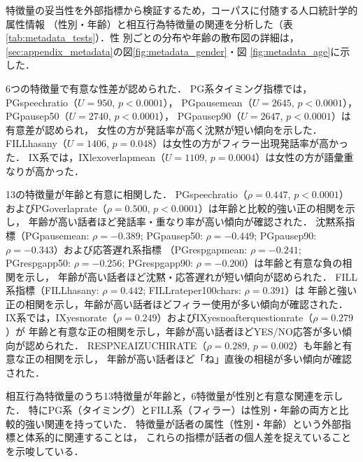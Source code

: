\documentclass[dvipdfmx,11pt,a4paper]{bxjsarticle}
\renewcommand{\_}{\paperorigunderscore\allowbreak}%
\begin{document}
特徴量の妥当性を外部指標から検証するため，コーパスに付随する人口統計学的属性情報
（性別・年齢）と相互行為特徴量の関連を分析した（表\ref{tab:metadata_tests}）．性
別ごとの分布や年齢の散布図の詳細は，\ref{sec:appendix_metadata}の図\ref{fig:metadata_gender}・図
\ref{fig:metadata_age}に示した．


\begin{table}[htbp]
\centering
\caption{相互行為特徴量とコーパス基本情報（性別・年齢）の関連．* $p < 0.05$}
\label{tab:metadata_tests}

\end{table}


6つの特徴量で有意な性差が認められた．
PG系タイミング指標では，PG\_speech\_ratio（$U = 950$, $p < 0.0001$），
PG\_pause\_mean（$U = 2645$, $p < 0.0001$），
PG\_pause\_p50（$U = 2740$, $p < 0.0001$），
PG\_pause\_p90（$U = 2647$, $p < 0.0001$）は有意差が認められ，
女性の方が発話率が高く沈黙が短い傾向を示した．
FILL\_has\_any（$U = 1406$, $p = 0.048$）は女性の方がフィラー出現発話率が高かった．
IX系では，IX\_lex\_overlap\_mean（$U = 1109$, $p = 0.0004$）は女性の方が語彙重なりが高かった．

13の特徴量が年齢と有意に相関した．
PG\_speech\_ratio（$\rho = 0.447$, $p < 0.0001$）およびPG\_overlap\_rate（$\rho = 0.500$, $p < 0.0001$）は年齢と比較的強い正の相関を示し，
年齢が高い話者ほど発話率・重なり率が高い傾向が確認された．
沈黙系指標（PG\_pause\_mean: $\rho = -0.389$; PG\_pause\_p50: $\rho = -0.449$;
PG\_pause\_p90: $\rho = -0.343$）および応答遅れ系指標
（PG\_resp\_gap\_mean: $\rho = -0.241$; PG\_resp\_gap\_p50: $\rho = -0.256$;
PG\_resp\_gap\_p90: $\rho = -0.200$）は年齢と有意な負の相関を示し，
年齢が高い話者ほど沈黙・応答遅れが短い傾向が認められた．
FILL系指標（FILL\_has\_any: $\rho = 0.442$; FILL\_rate\_per\_100chars: $\rho = 0.391$）は
年齢と強い正の相関を示し，年齢が高い話者ほどフィラー使用が多い傾向が確認された．
IX系では，IX\_yesno\_rate（$\rho = 0.249$）およびIX\_yesno\_after\_question\_rate（$\rho = 0.279$）が
年齢と有意な正の相関を示し，年齢が高い話者ほどYES/NO応答が多い傾向が認められた．
RESP\_NE\_AIZUCHI\_RATE（$\rho = 0.289$, $p = 0.002$）も年齢と有意な正の相関を示し，
年齢が高い話者ほど「ね」直後の相槌が多い傾向が確認された．

相互行為特徴量のうち13特徴量が年齢と，6特徴量が性別と有意な関連を示した．
特にPG系（タイミング）とFILL系（フィラー）は性別・年齢の両方と比較的強い関連を持っていた．
特徴量が話者の属性（性別・年齢）という外部指標と体系的に関連することは，
これらの指標が話者の個人差を捉えていることを示唆している．
\end{document}
